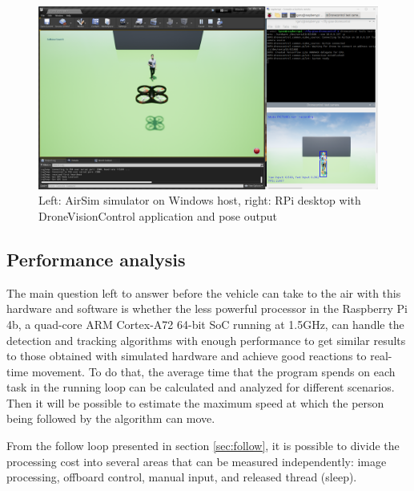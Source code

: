 \begin{figure}
  \centering
  \includegraphics[width=\textwidth, keepaspectratio]{img/airsim-rpi-test.png}
  \caption{Left: AirSim simulator on Windows host, right: RPi desktop with DroneVisionControl application and pose output}
  \label{fig:rpi-airsim-test}
\end{figure}

\subsection{Performance analysis}
\label{subsec:performance}

The main question left to answer before the vehicle can take to the air with this hardware and software is whether the less powerful processor in the Raspberry Pi 4b, a quad-core ARM Cortex-A72 64-bit SoC running at 1.5GHz, can handle the detection and tracking algorithms with enough performance to get similar results to those obtained with simulated hardware and achieve good reactions to real-time movement.
To do that, the average time that the program spends on each task in the running loop can be calculated and analyzed for different scenarios.
Then it will be possible to estimate the maximum speed at which the person being followed by the algorithm can move.

From the follow loop presented in section \ref{sec:follow}, it is possible to divide the processing cost into several areas that can be measured independently: image processing, offboard control, manual input, and released thread (sleep).

